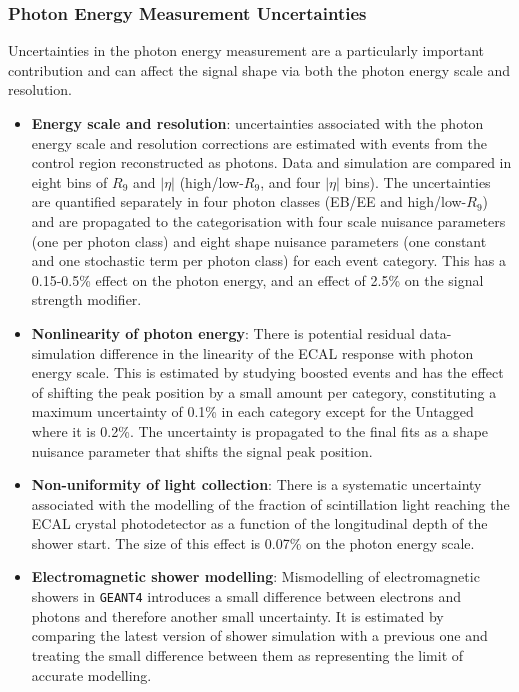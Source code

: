 \subsubsection{Photon Energy Measurement Uncertainties}
Uncertainties in the photon energy measurement are a particularly important contribution and can affect the signal shape via both the photon energy scale and resolution.
\begin{itemize}[noitemsep]
    \item {\textbf{Energy scale and resolution}: 
           uncertainties associated with the photon energy scale and resolution corrections
           are estimated with events from the \Zee control region reconstructed as photons. Data and simulation are compared in eight bins of $R_9$ and $|\eta|$ (high/low-$R_9$, and four $|\eta|$ bins). 
           The uncertainties are quantified separately in four photon classes (EB/EE and high/low-$R_9$) and are propagated to the categorisation with four scale nuisance parameters (one per photon class) and eight shape nuisance parameters (one constant and one stochastic term per photon class) for each event category. 
           This has a 0.15-0.5\% effect on the photon energy, and an effect of 2.5\% on the signal strength modifier. 
           }
    \item {\textbf{Nonlinearity of photon energy}: 
          There is potential residual data-simulation difference in the linearity of the ECAL response with photon energy scale. 
          This is estimated by studying boosted \Zee events and has the effect of shifting the peak position by a small amount per category, constituting a maximum uncertainty of 0.1\% in each category except for the Untagged where it is 0.2\%. The uncertainty is propagated to the final fits as a shape nuisance parameter that shifts the signal peak position.
          }
    \item {\textbf{Non-uniformity of light collection}: 
           There is a systematic uncertainty associated with the modelling of the fraction of scintillation light reaching the ECAL crystal photodetector as a function of the longitudinal depth of the shower start. The size of this effect is 0.07\% on the photon energy scale.
           }
    \item {\textbf{Electromagnetic shower modelling}: 
        Mismodelling of electromagnetic showers in \texttt{GEANT4} introduces a small difference between electrons and photons and therefore another small uncertainty. 
           It is estimated by comparing the latest version of shower simulation with a previous one and treating the small difference between them as representing the limit of accurate modelling. 
}
\end{itemize}
